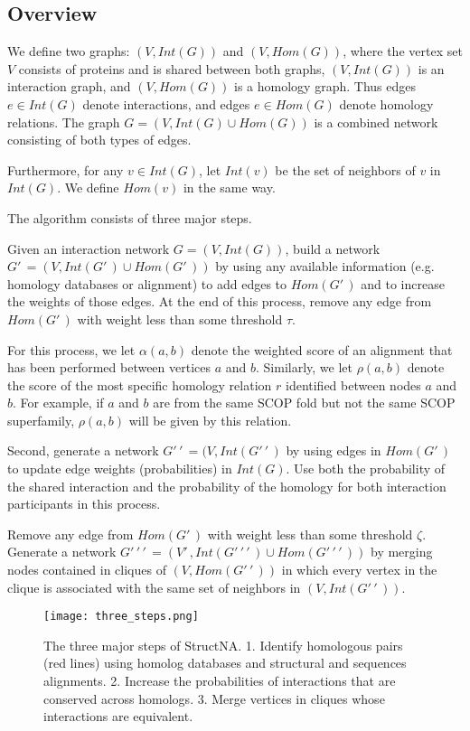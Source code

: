 \documentclass[12pt,twoside]{article}
\def\NI{\noindent}
\begin{document}
\subsection{Overview}

\NI We define two graphs: $(V, Int(G))$ and $(V, Hom(G))$, where the vertex set $V$ consists of proteins and is shared between both graphs, $(V, Int(G))$ is an interaction graph, and $(V, Hom(G))$ is a homology graph. Thus edges $e \in Int(G)$ denote interactions, and edges $e \in Hom(G)$ denote homology relations. The graph $G = (V,Int(G) \cup Hom(G))$ is a combined network consisting of both types of edges.

\NI Furthermore, for any $v \in Int(G)$, let $Int(v)$ be the set of neighbors of $v$ in $Int(G)$. We define $Hom(v)$ in the same way.

\NI The algorithm consists of three major steps.

\NI Given an interaction network $G=(V,Int(G))$, build a network $G'\,\! = (V,Int(G'\,\!) \cup Hom(G'\,\!))$ by using any available information (e.g. homology databases or alignment) to add edges to $Hom(G'\,\!)$ and to increase the weights of those edges. At the end of this process, remove any edge from $Hom(G'\,\!)$ with  weight less than some threshold $\tau$.

\NI For this process, we let $\alpha(a,b)$ denote the weighted score of an alignment that has been performed between vertices $a$ and $b$. Similarly, we let $\rho(a,b)$ denote the score of the most specific homology relation $r$ identified between nodes $a$ and $b$. For example, if $a$ and $b$ are from the same SCOP fold but not the same SCOP superfamily, $\rho(a,b)$ will be given by this relation.

\NI Second, generate a network $G'\,\!'\,\! = (V, Int(G'\,\!'\,\!)$ by using edges in $Hom(G'\,\!)$ to update edge weights (probabilities) in $Int(G)$. Use both the probability of the shared interaction and the probability of the homology for both interaction participants in this process.

\NI Remove any edge from $Hom(G'\,\!)$ with weight less than some threshold $\zeta$. Generate a network $G'\,\!'\,\!'\,\! = (V'\,\!, Int(G'\,\!'\,\!'\,\!) \cup Hom(G'\,\!'\,\!'\,\!))$ by merging nodes contained in cliques of $(V,Hom(G'\,\!'\,\!))$ in which every vertex in the clique is associated with the same set of neighbors  in $(V, Int(G'\,\!'\,\!))$.

\begin{figure}
\texttt{[image: three\_steps.png]}
\caption{The three major steps of StructNA. 1. Identify homologous pairs (red lines) using homolog databases and structural and sequences alignments. 2. Increase the probabilities of interactions that are conserved across homologs. 3. Merge vertices in cliques whose interactions are equivalent.}
\end{figure}
\end{document}
